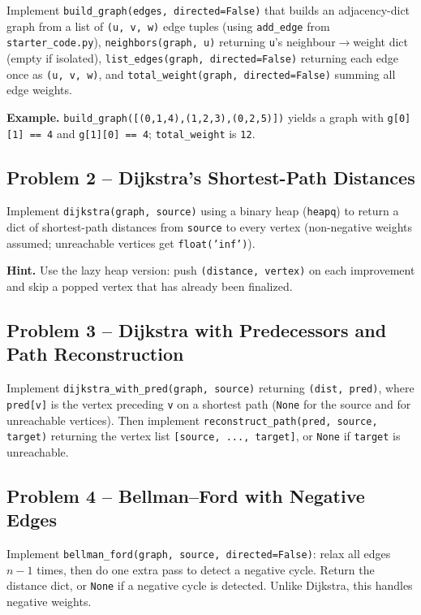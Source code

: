 \documentclass[11pt]{article}
\begin{document}
Implement \texttt{build\_graph(edges, directed=False)} that builds an adjacency-dict graph
from a list of \texttt{(u, v, w)} edge tuples (using \texttt{add\_edge} from
\texttt{starter\_code.py}), \texttt{neighbors(graph, u)} returning \texttt{u}'s
neighbour$\to$weight dict (empty if isolated), \texttt{list\_edges(graph,
directed=False)} returning each edge once as \texttt{(u, v, w)}, and
\texttt{total\_weight(graph, directed=False)} summing all edge weights.

\textbf{Example.} \texttt{build\_graph([(0,1,4),(1,2,3),(0,2,5)])} yields a graph with
\texttt{g[0][1] == 4} and \texttt{g[1][0] == 4}; \texttt{total\_weight} is \texttt{12}.

\subsection*{Problem 2 -- Dijkstra's Shortest-Path Distances}

Implement \texttt{dijkstra(graph, source)} using a binary heap (\texttt{heapq}) to return
a dict of shortest-path distances from \texttt{source} to every vertex (non-negative
weights assumed; unreachable vertices get \texttt{float('inf')}).

\textbf{Hint.} Use the lazy heap version: push \texttt{(distance, vertex)} on each
improvement and skip a popped vertex that has already been finalized.

\subsection*{Problem 3 -- Dijkstra with Predecessors and Path Reconstruction}

Implement \texttt{dijkstra\_with\_pred(graph, source)} returning \texttt{(dist, pred)},
where \texttt{pred[v]} is the vertex preceding \texttt{v} on a shortest path (\texttt{None}
for the source and for unreachable vertices). Then implement
\texttt{reconstruct\_path(pred, source, target)} returning the vertex list
\texttt{[source, ..., target]}, or \texttt{None} if \texttt{target} is unreachable.

\subsection*{Problem 4 -- Bellman--Ford with Negative Edges}

Implement \texttt{bellman\_ford(graph, source, directed=False)}: relax all edges $n-1$
times, then do one extra pass to detect a negative cycle. Return the distance dict, or
\texttt{None} if a negative cycle is detected. Unlike Dijkstra, this handles negative
weights.
\end{document}
